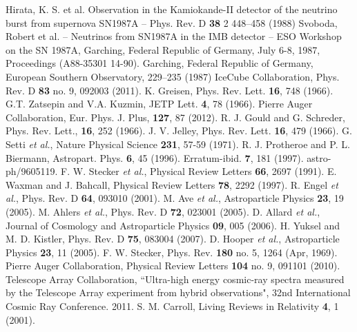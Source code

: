 \begin{thebibliography}{1}
 Hirata, K. S. et al. Observation in the Kamiokande-II detector of the neutrino burst from supernova SN1987A -- Phys. Rev. D \textbf{38} 2 448--458 (1988)
Svoboda, Robert et al. -- Neutrinos from SN1987A in the IMB detector -- ESO Workshop on the SN 1987A, Garching, Federal Republic of Germany, July 6-8, 1987, Proceedings (A88-35301 14-90). Garching, Federal Republic of Germany, European Southern Observatory,  229--235 (1987)
 IceCube Collaboration, Phys. Rev. D \textbf{83} no. 9,  092003 (2011).
 K. Greisen, Phys. Rev. Lett. \textbf{16}, 748 (1966).
 G.T. Zatsepin and V.A. Kuzmin, JETP Lett. \textbf{4}, 78 (1966).
 Pierre Auger Collaboration, Eur. Phys. J. Plus, \textbf{127}, 87 (2012).
 R. J. Gould and G. Schreder, Phys. Rev. Lett., \textbf{16}, 252 (1966).
  J. V. Jelley, Phys. Rev. Lett. \textbf{16}, 479 (1966).
 G. Setti {\it et al.}, Nature Physical Science \textbf{231}, 57-59 (1971).
 R. J. Protheroe and P. L. Biermann, Astropart. Phys. \textbf{6}, 45 (1996). Erratum-ibid. \textbf{7}, 181 (1997). astro-ph/9605119.
 F. W. Stecker  {\it et al.}, Physical Review Letters \textbf{66}, 2697 (1991).
 E. Waxman and J. Bahcall,  Physical Review Letters \textbf{78}, 2292 (1997).
 R. Engel {\it et al.}, Phys. Rev. D \textbf{64}, 093010 (2001).
 M. Ave {\it et al.}, Astroparticle Physics \textbf{23}, 19 (2005).
 M. Ahlers {\it et al.}, Phys. Rev. D \textbf{72},  023001 (2005).
  D. Allard {\it et al.}, Journal of Cosmology and Astroparticle Physics \textbf{09},  005 (2006).
H. Yuksel and M. D. Kistler, Phys. Rev. D \textbf{75}, 083004 (2007).
 D. Hooper {\it et al.}, Astroparticle Physics \textbf{23}, 11 (2005).
 F. W. Stecker, Phys. Rev. \textbf{180} no. 5, 1264 (Apr, 1969).
 Pierre Auger Collaboration, Physical Review Letters \textbf{104} no. 9, 091101 (2010).
 Telescope Array Collaboration, ``Ultra-high energy cosmic-ray spectra measured by the Telescope Array experiment from hybrid observations", 32nd International Cosmic Ray Conference. 2011.
 S. M. Carroll, Living Reviews in Relativity \textbf{4}, 1 (2001).

\end{thebibliography}
